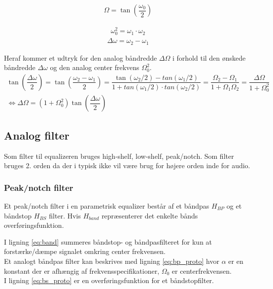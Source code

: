     \begin{align}
    \Omega = \tan\left(  \dfrac{\omega_0}{2} \right) 
    \end{align}

    \begin{align}
        \omega_0^2 = \omega_1 \cdot \omega_2 
    \end{align}
    \begin{align}
        \Delta \omega = \omega_2 - \omega_1
    \end{align}

    Heraf kommer et udtryk for den analog båndredde $\Delta \Omega$ i forhold til den ønskede båndredde $\Delta \omega$ og den analog center frekvens $\Omega_0^2$.
\begin{align}
    \tan \left( \dfrac{\Delta \omega}{2} \right) = \tan \left( \dfrac{\omega_2 - \omega_1}{2} \right) = \dfrac{\tan(\omega_2/2) - tan(\omega_1/2)}{1 + tan(\omega_1/2) \cdot tan(\omega_2/2)} = \dfrac{\Omega_2 - \Omega_1}{1 + \Omega_1 \Omega_2} = \dfrac{\Delta \Omega}{1 + \Omega_0^2}\\
    \iff \Delta \Omega = (1 + \Omega_0^2) \tan \left( \dfrac{\Delta \omega}{2} \right)
\end{align}


    \subsection{Analog filter}

    Som filter til equalizeren bruges high-shelf, low-shelf, peak/notch.
    Som filter bruges 2. orden da der i typisk ikke vil være brug for højere orden
     inde for audio. 



     \subsubsection{Peak/notch filter}


     Et peak/notch filter i en parametrisk equalizer består af et båndpas $H_{BP}$ og et båndstop $H_{BS}$ filter. Hvis
    $H_{band}$ repræsenterer det enkelte bånds overføringsfunktion.

    I ligning \ref{eq:band} summeres båndstop- og båndpasfilteret for kun
    at forstærke/dæmpe signalet omkring center frekvensen.\\
    Et analogt båndpas filter kan beskrives med ligning \ref{eq:bp_proto} 
    hvor $\alpha$ er en konstant der er afhængig af frekvensspecifikationer, $\Omega_0$ er centerfrekvensen.\\
    I ligning \ref{eq:bs_proto} er en overføringsfunktion for et båndstopfilter.


